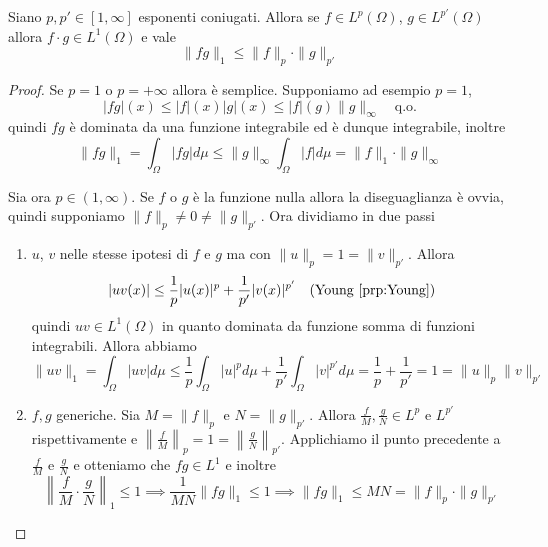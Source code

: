 \begin{theorem}\label{thm:Holder}
    Siano \(p, p' \in [1, \infty]\) esponenti coniugati. Allora se \(f \in
    L^{p}{(\Omega)}\), \(g \in L^{p'}{(\Omega)}\) allora \(f\cdot g \in
    L^{1}{(\Omega)}\) e vale
    \[
        \|fg\|_1 \le \|f\|_p \cdot \|g\|_{p'}
    \]
\end{theorem}
\begin{proof}
    Se \(p = 1\) o \(p = +\infty\) allora è semplice. Supponiamo
    ad esempio \(p = 1\), 
    \[
        |fg|{(x)} \le |f|{(x)}|g|{(x)} \le |f|{(g)} \|g\|_{\infty} \quad \text{
        q.o.}
    \]
    quindi \(fg\) è dominata da una funzione integrabile ed è dunque
    integrabile, inoltre
    \[
        \|fg\|_1 = \int_\Omega |fg| d\mu \le \|g\|_\infty \int_\Omega |f| d\mu = \|f\|_1 \cdot \|g\|_\infty
    \]

    Sia ora \(p \in (1, \infty)\). Se \(f\) o \(g\) è la funzione nulla allora
    la diseguaglianza è ovvia, quindi supponiamo \(\|f\|_p \neq 0 \neq
    \|g\|_{p'} \). Ora dividiamo in due passi
\begin{enumerate}[label = \arabic*.]
    \item \(u\), \(v\) nelle stesse ipotesi di \(f\) e \(g\) ma con \(\|u\|_p =
        1 = \|v\|_{p'} \). Allora
        \[
            |uv{(x)}| \le  \frac{1}{p}|u{(x)}|^{p} + \frac{1}{ p' }|v{(x)}|^{p'}
            \quad \text{(Young~\ref{prp:Young})}
        \]
        quindi \(uv \in L^{1}(\Omega)\) in quanto dominata da funzione somma di
        funzioni integrabili. Allora abbiamo
        \[
            \|uv\|_1 = \int_\Omega |uv| d\mu \le \frac{1}{p} \int_\Omega |u|^{p} d\mu +
            \frac{1}{p'} \int_\Omega |v|^{p'} d\mu = \frac{1}{p} + \frac{1}{p'}
            = 1 = \|u\|_p \|v\|_{p'}
        \]
    \item \(f, g\) generiche. Sia \(M = \|f\|_p\) e \(N = \|g\|_{p'}\). Allora
        \(\frac{f}{M}, \frac{g}{N} \in L^{p}\) e \(L^{p'}\) rispettivamente e
        \(\left\| \frac{f}{M} \right\|_p = 1 = \left\| \frac{g}{N} \right\|_{p'}\).
        Applichiamo il punto precedente a \(\frac{f}{M}\) e \(\frac{g}{N}\) e
        otteniamo che \(fg \in L^{1}\) e inoltre
        \[
            \left\| \frac{f}{M} \cdot \frac{g}{N} \right\|_1 \le 1 \implies
            \frac{1}{MN} \|fg\|_1 \le 1 \implies \|fg\|_1 \le MN = \|f\|_p \cdot
            \|g\|_{p'}
        \]
\end{enumerate}
\end{proof}

